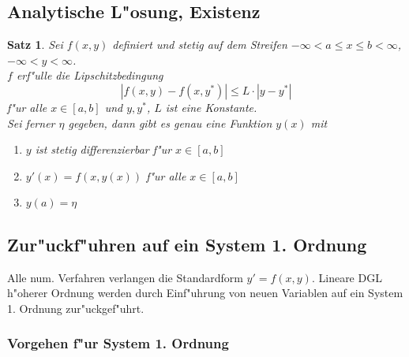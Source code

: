 \documentclass[german, 10pt, a4paper, twocolumn]{scrartcl}
\newtheorem{satz}{Satz}[section]
\theoremstyle{definition}
\begin{document}
\subsection{Analytische L"osung, Existenz}

\begin{satz}
 Sei $f(x,y)$ definiert und stetig auf dem Streifen $-\infty < a \leq x \leq b < \infty$, $-\infty < y < \infty$.\\
 $f$ erf"ulle die Lipschitzbedingung
 \begin{equation}
 	| f(x,y) - f(x,y^*)| \leq L \cdotp |y - y^*|
	\label{eq:lipschitz}
 \end{equation}
 f"ur alle $x \in [a,b]$ und $y,y^*$, $L$ ist eine Konstante.\\
 Sei ferner $\eta$ gegeben, dann gibt es genau eine Funktion $y(x)$ mit
 \begin{enumerate}
 	\item $y$ ist stetig differenzierbar f"ur $x\in[a,b]$
	\item $y'(x) = f(x,y(x))$ f"ur alle $x \in [a,b]$
	\item $y(a) = \eta$
 \end{enumerate}
\end{satz}

\subsection{Zur"uckf"uhren auf ein System 1. Ordnung}

Alle num. Verfahren verlangen die Standardform $y' = f(x,y)$. Lineare DGL h"oherer Ordnung werden durch Einf"uhrung von neuen Variablen auf ein System 1. Ordnung zur"uckgef"uhrt.

\subsubsection{Vorgehen f"ur System 1. Ordnung}
\end{document}
